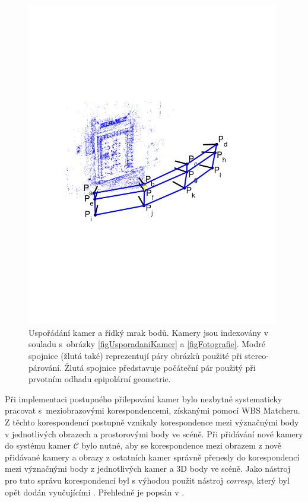 \documentclass[11pt,oneside,a4paper,pdftex]{article}   %
\begin{document}
			\begin{figure}[htb]
					\centering
						\includegraphics[width=11cm,clip=true,trim=3cm 8.5cm 3cm 8cm]{pictures/cameras_and_sparse_points_cloud.pdf}
				\caption{Uspořádání kamer a řídký mrak bodů. Kamery jsou indexovány v souladu s~obrázky
					\ref{figUsporadaniKamer} a \ref{figFotografie}. Modré spojnice (žlutá také)
					reprezentují páry obrázků použité při stereo-párování. Žlutá spojnice představuje
					počáteční pár použitý při prvotním odhadu epipolární geometrie.
					}
				\label{figCamerasAndSparseCloud}
			\end{figure}

		Při implementaci postupného přilepování kamer bylo nezbytné systematicky pracovat
		s~meziobrazovými korespondencemi, získanými pomocí WBS Matcheru. Z těchto korespondencí postupně
		vznikaly korespondence mezi význačnými body v jednotlivých obrazech a prostorovými body ve scéně.
		Při přidávání nové kamery do systému kamer $\mathcal C$ bylo nutné, aby se korespondence mezi
		obrazem z nově přidávané kamery a obrazy z ostatních kamer správně přenesly do korespondencí mezi
		význačnými body z jednotlivých kamer a 3D body ve scéně.
		Jako nástroj pro tuto správu korespondencí byl s výhodou použit nástroj \emph{corresp},
		který byl opět dodán vyučujícími \cite{code_repo}. Přehledně je popsán v
		\cite{gluing_correspondences}.
		
\end{document}
